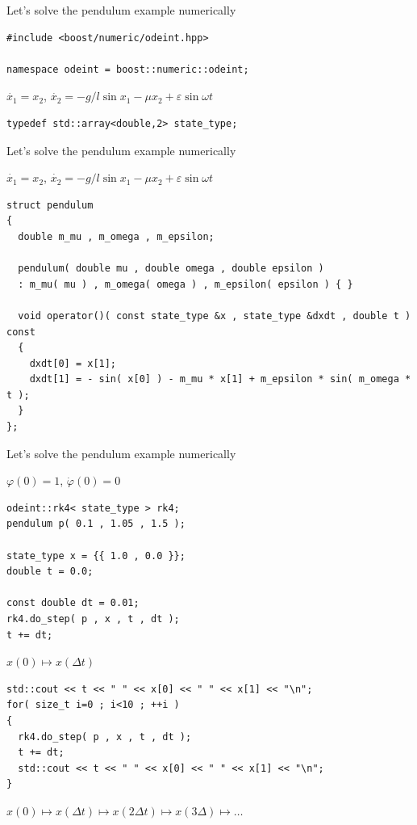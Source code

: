 \begin{frame}[fragile]

\centerline{ \Large Let's solve the pendulum example numerically}


\begin{lstlisting}
#include <boost/numeric/odeint.hpp>

namespace odeint = boost::numeric::odeint;
\end{lstlisting}

$\dot{x_1} = x_2$, $\dot{x_2} = - g / l \sin x_1 - \mu x_2 + \varepsilon \sin \omega t$
\begin{lstlisting}
typedef std::array<double,2> state_type;
\end{lstlisting}

\end{frame}

\begin{frame}[fragile]

\centerline{ \Large Let's solve the pendulum example numerically}

$\dot{x_1} = x_2$, $\dot{x_2} = - g / l \sin x_1 - \mu x_2 + \varepsilon \sin \omega t$
\begin{lstlisting}
struct pendulum
{
  double m_mu , m_omega , m_epsilon;

  pendulum( double mu , double omega , double epsilon )
  : m_mu( mu ) , m_omega( omega ) , m_epsilon( epsilon ) { }

  void operator()( const state_type &x , state_type &dxdt , double t ) const
  {
    dxdt[0] = x[1];
    dxdt[1] = - sin( x[0] ) - m_mu * x[1] + m_epsilon * sin( m_omega * t );
  }
};
\end{lstlisting}

\end{frame}

\begin{frame}[fragile]
 \centerline{ \Large Let's solve the pendulum example numerically}

$\varphi(0) = 1$, $\dot{\varphi}(0) = 0$

\begin{lstlisting}
odeint::rk4< state_type > rk4;
pendulum p( 0.1 , 1.05 , 1.5 );

state_type x = {{ 1.0 , 0.0 }};
double t = 0.0;

const double dt = 0.01;
rk4.do_step( p , x , t , dt );
t += dt;
\end{lstlisting}

$x(0) \mapsto x(\Delta t)$

\begin{lstlisting}
std::cout << t << " " << x[0] << " " << x[1] << "\n";
for( size_t i=0 ; i<10 ; ++i )
{
  rk4.do_step( p , x , t , dt );
  t += dt;
  std::cout << t << " " << x[0] << " " << x[1] << "\n";
}
\end{lstlisting}

$x(0) \mapsto x(\Delta t) \mapsto x(2\Delta t) \mapsto x(3\Delta) \mapsto \dots$

\end{frame}


